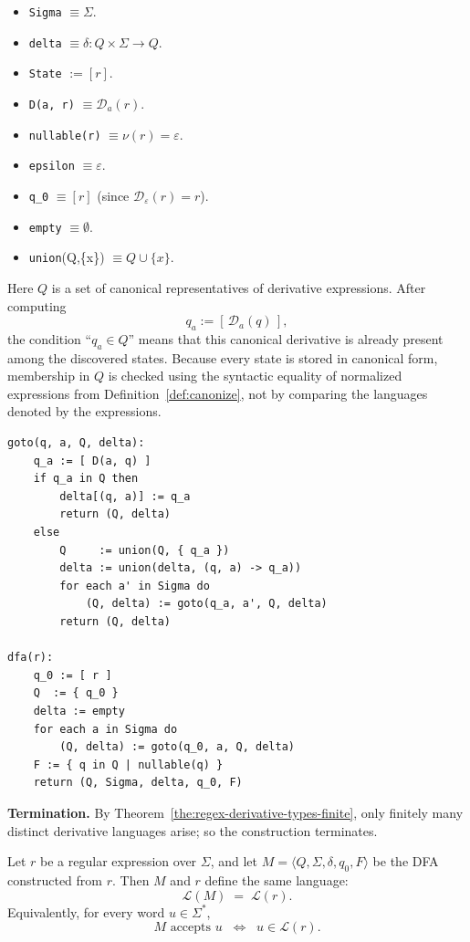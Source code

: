 \begin{itemize}
  \item \texttt{Sigma} $\equiv \Sigma$.
  \item \texttt{delta} $\equiv \delta : Q\times\Sigma\to Q$.
  \item \texttt{State} $:= [r]$.
  \item \texttt{D(a, r)} $\equiv \mathcal{D}_a(r)$.
  \item \texttt{nullable(r)} $\equiv \nu(r)=\varepsilon$.
  \item \texttt{epsilon} $\equiv \varepsilon$.
  \item \texttt{q\_0} $\equiv [r]$ (since $\mathcal{D}_\varepsilon(r)=r$).
  \item \texttt{empty} $\equiv \emptyset$.
  \item \texttt{union}(Q,\{x\}) $\equiv Q \cup \{x\}$.
\end{itemize}

Here $Q$ is a set of canonical representatives of derivative expressions. After computing
\[
q_a := [\,\mathcal{D}_a(q)\,],
\]
the condition ``$q_a \in Q$'' means that this canonical derivative is already present among the discovered states. Because every state is stored in canonical form, membership in $Q$ is checked using the syntactic equality of normalized expressions from Definition~\ref{def:canonize}, not by comparing the languages denoted by the expressions.

\begin{lstlisting}[style=thesiscode,label={lst:deriv-dfa-paper}]
 goto(q, a, Q, delta):
    q_a := [ D(a, q) ]
    if q_a in Q then
        delta[(q, a)] := q_a
        return (Q, delta)
    else
        Q     := union(Q, { q_a })
        delta := union(delta, (q, a) -> q_a))
        for each a' in Sigma do
            (Q, delta) := goto(q_a, a', Q, delta)
        return (Q, delta)

dfa(r):
    q_0 := [ r ]
    Q  := { q_0 }
    delta := empty
    for each a in Sigma do
        (Q, delta) := goto(q_0, a, Q, delta)
    F := { q in Q | nullable(q) }
    return (Q, Sigma, delta, q_0, F)
\end{lstlisting}

\textbf{Termination.}
By Theorem~\ref{the:regex-derivative-types-finite}, only finitely many
distinct derivative languages arise; so the construction terminates.

\begin{theorem}\label{the:dfa-correctness}
Let $r$ be a regular expression over $\Sigma$, and let
$M = \langle Q, \Sigma, \delta, q_0, F \rangle$
be the DFA constructed from $r$.
Then $M$ and $r$ define the same language:
\[
  \mathcal{L}(M) \;=\; \mathcal{L}(r).
\]
Equivalently, for every word $u \in \Sigma^*$,
\[
  M \text{ accepts } u
  \;\;\Longleftrightarrow\;\;
  u \in \mathcal{L}(r).
\]
\end{theorem}

